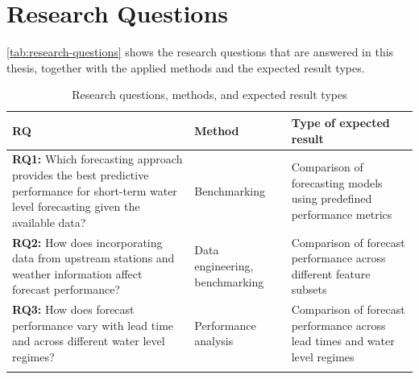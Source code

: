 \section{Research Questions}
\autoref{tab:research-questions} shows the research questions that are answered in this thesis, together with the applied methods and the expected result types.
\begin{table}[htbp]
    \centering
    \caption{Research questions, methods, and expected result types}
    \label{tab:research-questions}
    \label{acro:RQ} %
    \begin{tabularx}{\textwidth}{@{}XXX@{}}
        \toprule
        \textbf{\acf{RQ}} & \textbf{Method} & \textbf{Type of expected result} \\
        \midrule
        \textbf{\acs{RQ}1:} Which forecasting approach provides the best predictive performance for short-term water level forecasting given the available data? & Benchmarking & Comparison of forecasting models using predefined performance metrics \\
        \addlinespace
        \textbf{\acs{RQ}2:} How does incorporating data from upstream stations and weather information affect forecast performance? & Data engineering, benchmarking & Comparison of forecast performance across different feature subsets \\
        \addlinespace
        \textbf{\acs{RQ}3:} How does forecast performance vary with lead time and across different water level regimes? & Performance analysis & Comparison of forecast performance across lead times and water level regimes\\
        \addlinespace
        \bottomrule
    \end{tabularx}
\end{table}
